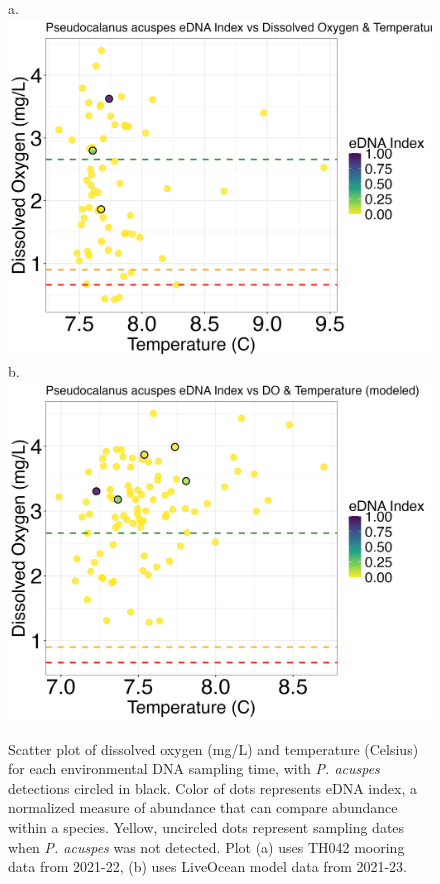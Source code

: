 \documentclass[12pt,twoside]{reedthesis}
\begin{document}
	\begin{figure}[!h]
		\begin{center}
			a. \includegraphics[scale=0.3]{Pacuspes_Scatter_noOut}
			b. \includegraphics[scale=0.3]{Pacuspes_Scatter_AllYr_mod_noOut}
			\caption[\textit{P. acuspes} scatterplot]{\footnotesize{Scatter plot of dissolved oxygen (mg/L) and temperature (Celsius) for each environmental DNA sampling time, with \textit{P. acuspes} detections circled in black. Color of dots represents eDNA index, a normalized measure of abundance that can compare abundance within a species. Yellow, uncircled dots represent sampling dates when \textit{P. acuspes} was not detected. Plot (a) uses TH042 mooring data from 2021-22, (b) uses LiveOcean model data from 2021-23.}} %
				\label{PacuspesScatter}
		\end{center}
	\end{figure} 
	
\end{document}
